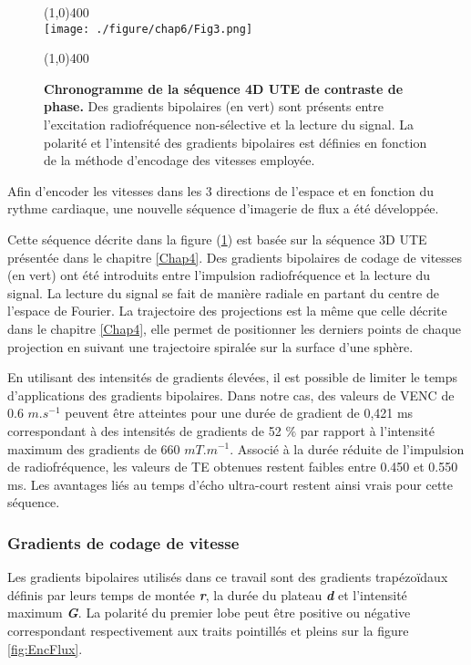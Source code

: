 \begin{figure}[H]
\centering
\line(1,0){400} \\
\texttt{[image: ./figure/chap6/Fig3.png]}
\caption[Chronogramme de la séquence 4D UTE de contraste de phase.]{\label{fig:Chrono4DFlux}\textbf{ Chronogramme de la séquence 4D UTE de contraste de phase.} Des gradients bipolaires (en vert) sont présents entre l'excitation radiofréquence non-sélective et la lecture du signal. La polarité et l'intensité des gradients bipolaires est définies en fonction de la méthode d'encodage des vitesses employée.}
\line(1,0){400} \\ 
\end{figure}

Afin d’encoder les vitesses dans les 3 directions de l’espace et en fonction du rythme cardiaque, une nouvelle séquence d’imagerie de flux a été développée.

Cette séquence décrite dans la figure (\ref{fig:Chrono4DFlux}) est basée sur la séquence 3D UTE présentée dans le chapitre \ref{Chap4}.  Des gradients bipolaires de codage de vitesses (en vert) ont été introduits entre l’impulsion radiofréquence et la lecture du signal. La lecture du signal se fait de manière radiale en partant du centre de l’espace de Fourier. La trajectoire des projections est la même que celle décrite dans le chapitre \ref{Chap4}, elle permet de positionner les derniers points de chaque projection en suivant une trajectoire spiralée sur la surface d'une sphère.

En utilisant des intensités de gradients élevées, il est possible de limiter le temps d’applications des gradients bipolaires. Dans notre cas, des valeurs de VENC de 0.6 $m.s^{-1}$ peuvent être atteintes pour une durée de gradient de 0,421 ms correspondant à des intensités de gradients de 52 $\%$ par rapport à l'intensité maximum des gradients de 660 $mT.m^{-1}$. Associé à la durée réduite de l'impulsion de radiofréquence, les valeurs de TE obtenues restent faibles entre 0.450 et 0.550 ms. Les avantages liés au temps d'écho ultra-court restent ainsi vrais pour cette séquence.

\newpage
\subsubsection{Gradients de codage de vitesse}

Les gradients bipolaires utilisés dans ce travail sont des gradients trapézoïdaux définis par leurs temps de montée \textbf{\textit{r}}, la durée du plateau \textbf{\textit{d}} et l’intensité maximum \textbf{\textit{G}}. La polarité du premier lobe peut être positive ou négative correspondant respectivement aux traits pointillés et pleins sur la figure \ref{fig:EncFlux}.


